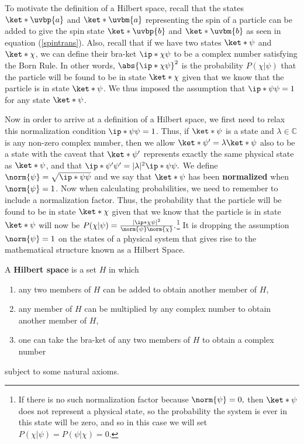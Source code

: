 \documentclass[12pt]{report}
\begin{document}
To motivate the definition of a Hilbert space, recall that the states $\ket*{\uvbp{a}}$ and $\ket*{\uvbm{a}}$ representing the spin of  a particle can be added to give the spin state $\ket*{\uvbp{b}}$ and $\ket*{\uvbm{b}}$ as seen in equation (\ref{spintrans}). Also, recall that if we have two states $\ket*{\psi}$ and $\ket*{\chi}$, we can define their bra-ket $\ip*{\chi}{\psi}$ to be a complex number satisfying the Born Rule. In other words, $\abs{\ip*{\chi}{\psi}}^2$ is the probability $P(\chi|\psi)$ that the particle will be found to be in state $\ket*{\chi}$ given that we know that the particle is in state $\ket*{\psi}$. We thus imposed the assumption that  $\ip*{\psi}{\psi}=1$ for any state $\ket*{\psi}$. 

Now in order to arrive at a definition of a Hilbert space, we first need to relax this normalization condition $\ip*{\psi}{\psi}=1$. Thus, if $\ket*{\psi}$  is a state and $\lambda\in\mathbb{C}$ is any non-zero complex number, then we allow $\ket*{\psi'}=\lambda\ket*{\psi}$ also to be a state with the caveat that $\ket*{\psi'}$ represents exactly the same physical state as $\ket*{\psi}$, and that $\ip*{\psi'}{\psi'}=|\lambda|^2\ip*{\psi}{\psi}.$ We define $\norm{\psi}=\sqrt{\ip*{\psi}{\psi}}$ %
%
and we say that $\ket*{\psi}$ has been \textbf{normalized} when $\norm{\psi}=1$. Now when calculating probabilities, we need to remember to include a normalization factor. Thus, the probability that the particle will be found to be in state $\ket*{\chi}$ given that we know that the particle is in state $\ket*{\psi}$ will now be $P(\chi|\psi) = \frac{|\ip*{\chi}{\psi}|^2}{\norm{\psi}\norm{\chi}}.$\footnote{ If there is no such normalization factor because $\norm{\psi}=0,$ then $\ket*{\psi}$ does not represent a physical state, so the probability the system is ever in this state will be zero, and so in this case we will set $P(\chi|\psi)=P(\psi|\chi)=0.$} It is  dropping the assumption $\norm{\psi}=1$ on the states of a physical system that gives rise to the mathematical structure known as a Hilbert Space.   

A \textbf{Hilbert space} is a set $H$ %
%
in which 
\begin{enumerate}[noitemsep, nosep, topsep=0pt]
\item any two members of $H$ can be added to obtain another member of $H$, 
\item any member of $H$ can be multiplied by any complex number to obtain another member of $H$,
\item one can take the bra-ket of any two members of $H$ to obtain a complex number\end{enumerate}
subject to some natural axioms.\footnotemark
\end{document}
